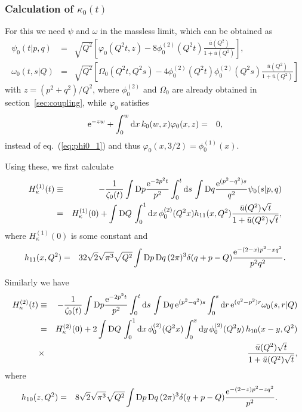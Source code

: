 \documentclass[preprint]{ptephy_v1}%
\newcommand{\rme}{{\rm e}}
\newcommand{\rmd}{{\rm d}}
\newcommand{\rmD}{{\rm D}}
\begin{document}
\subsubsection{Calculation of $\kappa_0(t)$}
For this we need $\psi$ and $\omega$ in the massless limit, which can be obtained as
\begin{eqnarray}
\psi_0(t\vert p,q) &=& \sqrt{Q^2}\left[ \varphi_0(Q^2t, z) - 8\phi_0^{(2)}(Q^2 t) \frac{\bar u(Q^2)}{1+\bar u(Q^2)} \right], \\
\omega_0(t,s \vert Q) &=& \sqrt{Q^2}\left[ \Omega_0(Q^2t,Q^2s) - 4\phi_0^{(2)}( Q^2t) \phi_0^{(2)}( Q^2s)
\frac{ \bar u(Q^2)}{1+\bar u(Q^2)} \right] 
\end{eqnarray}
with $z=(p^2+q^2)/Q^2$, where $\phi_0^{(2)}$ and $\Omega_0$ are already obtained in section~\ref{sec:coupling}, while
$\varphi_0$ satisfies
\begin{eqnarray}
\rme^{-z w} +\int_0^{w}  \rmd x\, k_0(w,x) \varphi_0(x,z) &=& 0,
\end{eqnarray}
 instead of eq.~(\ref{eq:phi0_1}) and thus $\varphi_0(x,3/2) =\phi_0^{(1)}(x) $.

Using these, we first calculate
\begin{eqnarray}
H_{\kappa}^{(1)}(t) &\equiv & -\frac{1}{\zeta_0(t)} \int \rmD p \frac{\rme^{-2p^2t}}{p^2} \int_0^t \rmd s\, \int \rmD q
\frac{\rme^{(p^2-q^2)s}}{q^2} \psi_0(s\vert p,q) \nonumber \\
&=& H_\kappa^{(1)}(0) +\int \rmD Q\, \int_0^1 \rmd x\,  \phi_0^{(2)}(Q^2 x) h_{11}(x,Q^2) \frac{ \bar u(Q^2)\sqrt{t}}{1+\bar u(Q^2) \sqrt{t}},
\end{eqnarray}
where  $H_\kappa^{(1)}(0)$ is some constant and
\begin{eqnarray}
h_{11}(x,Q^2) &=& 32\sqrt{2}\sqrt{\pi^3}\sqrt{Q^2}\int\rmD p\, \rmD q\, (2\pi)^3\delta(q+p-Q) \frac{\rme^{-(2-x)p^2-xq^2}}{p^2 q^2} .
\end{eqnarray}

Similarly we have
\begin{eqnarray}
H_{\kappa}^{(2)}(t) &\equiv & -\frac{1}{\zeta_0(t)} \int \rmD p \frac{\rme^{-2p^2t}}{p^2} \int_0^t \rmd s\, \int \rmD q\,
\rme^{(p^2-q^2)s} \int_0^s \rmd r\,  \rme^{(q^2-p^2)r}\omega_0(s,r\vert Q) \nonumber \\
&=& H_{\kappa}^{(2)}(0) + 2 \int \rmD Q\, \int_0^1  \rmd x\, \phi_0^{(2)}(Q^2x)  \int_0^x  \rmd y\, \phi_0^{(2)}(Q^2y) \,
h_{10}(x-y,Q^2) \nonumber \\
&\times & \frac{\bar u(Q^2)\sqrt{t}}{1+ \bar u(Q^2)\sqrt{t}},
\end{eqnarray}
where
\begin{eqnarray}
h_{10}(z,Q^2) &=& 8\sqrt{2}\sqrt{\pi^3}\sqrt{Q^2}\int \rmD p\, \rmD q\, (2\pi)^{3}\delta(q+p-Q) \frac{\rme^{-(2-z)p^2-z q^2}}{p^2} .~~~~
\end{eqnarray}
\end{document}
